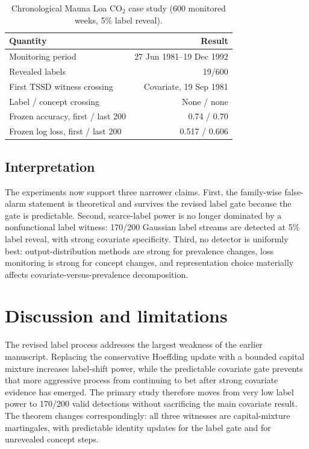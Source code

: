 \documentclass[11pt,a4paper]{article}
\theoremstyle{definition}
\newcommand{\1}{\mathbf{1}}
\begin{document}
\begin{table}[t]
\centering
\caption{Chronological Mauna Loa CO$_2$ case study (600 monitored weeks, 5\% label reveal).}
\label{tab:co2}
\small
\begin{tabular}{lr}
\toprule
Quantity & Result \\
\midrule
Monitoring period & 27 Jun 1981--19 Dec 1992 \\
Revealed labels & 19/600 \\
First TSSD witness crossing & Covariate, 19 Sep 1981 \\
Label / concept crossing & None / none \\
Frozen accuracy, first / last 200 & 0.74 / 0.70 \\
Frozen log loss, first / last 200 & 0.517 / 0.606 \\
\bottomrule
\end{tabular}
\end{table}

\subsection{Interpretation}
The experiments now support three narrower claims. First, the family-wise false-alarm statement is theoretical and survives the revised label gate because the gate is predictable. Second, scarce-label power is no longer dominated by a nonfunctional label witness: 170/200 Gaussian label streams are detected at 5\% label reveal, with strong covariate specificity. Third, no detector is uniformly best: output-distribution methods are strong for prevalence changes, loss monitoring is strong for concept changes, and representation choice materially affects covariate-versus-prevalence decomposition.

\section{Discussion and limitations}
\label{sec:discuss}

The revised label process addresses the largest weakness of the earlier manuscript. Replacing the conservative Hoeffding update with a bounded capital mixture increases label-shift power, while the predictable covariate gate prevents that more aggressive process from continuing to bet after strong covariate evidence has emerged. The primary study therefore moves from very low label power to 170/200 valid detections without sacrificing the main covariate result. The theorem changes correspondingly: all three witnesses are capital-mixture martingales, with predictable identity updates for the label gate and for unrevealed concept steps.
\end{document}
